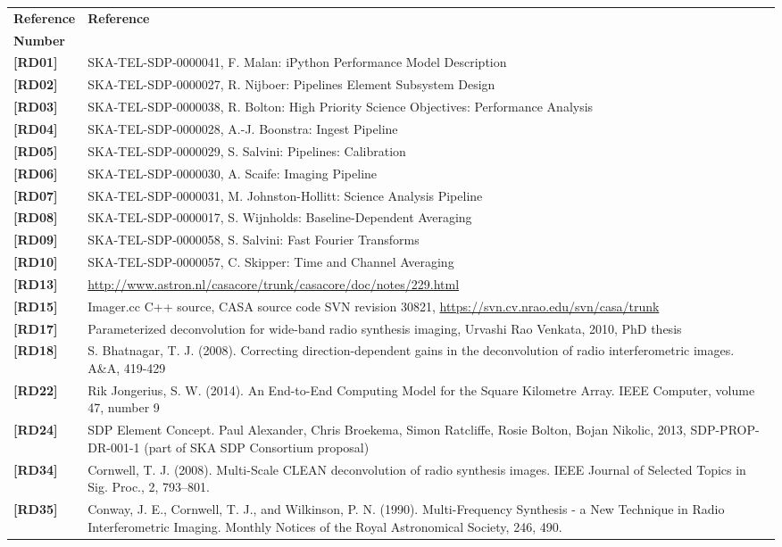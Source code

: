 \documentclass[11pt,a4paper]{article}
\begin{document}
 \begin{center}
 \begin{tabularx}{\textwidth}{|l|X|}
     \hline
     \bf{Reference} & \bf{Reference}\\
     \bf{Number} & \\
     \hline
   {\bf [RD01]} & SKA-TEL-SDP-0000041, F. Malan: iPython Performance Model Description\\
   {\bf [RD02]} & SKA-TEL-SDP-0000027, R. Nijboer: Pipelines Element Subsystem Design\\
   {\bf [RD03]} & SKA-TEL-SDP-0000038, R. Bolton: High Priority Science Objectives: Performance Analysis\\
   {\bf [RD04]} & SKA-TEL-SDP-0000028, A.-J. Boonstra: Ingest Pipeline\\
   {\bf [RD05]} & SKA-TEL-SDP-0000029, S. Salvini: Pipelines: Calibration\\
   {\bf [RD06]} & SKA-TEL-SDP-0000030, A. Scaife: Imaging Pipeline\\
   {\bf [RD07]} & SKA-TEL-SDP-0000031, M. Johnston-Hollitt: Science Analysis Pipeline\\
   {\bf [RD08]} & SKA-TEL-SDP-0000017, S. Wijnholds: Baseline-Dependent Averaging\\
   {\bf [RD09]} & SKA-TEL-SDP-0000058, S. Salvini: Fast Fourier Transforms\\
   {\bf [RD10]} & SKA-TEL-SDP-0000057, C. Skipper: Time and Channel Averaging\\
   {\bf [RD13]} & \url{http://www.astron.nl/casacore/trunk/casacore/doc/notes/229.html}\\
   {\bf [RD15]} & Imager.cc C++ source, CASA source code SVN revision 30821, \url{https://svn.cv.nrao.edu/svn/casa/trunk}\\ 
   {\bf [RD17]} & Parameterized deconvolution for wide-band radio synthesis imaging, Urvashi Rao Venkata, 2010, PhD thesis\\
   {\bf [RD18]} & S. Bhatnagar, T. J. (2008). Correcting direction-dependent gains in the deconvolution of radio interferometric images. A\&A, 419-429\\
   {\bf [RD22]} & Rik Jongerius, S. W. (2014). An End-to-End Computing Model for the Square Kilometre Array. IEEE Computer, volume 47, number 9\\
   {\bf [RD24]} & SDP Element Concept. Paul Alexander, Chris Broekema, Simon Ratcliffe, Rosie Bolton, Bojan Nikolic, 2013, SDP-PROP-DR-001-1 (part of SKA SDP Consortium proposal)\\
   {\bf [RD34]} & Cornwell, T. J. (2008). Multi-Scale CLEAN deconvolution of radio synthesis images. IEEE Journal of Selected Topics in Sig. Proc., 2, 793–801.\\
   {\bf [RD35]} & Conway, J. E., Cornwell, T. J., and Wilkinson, P. N. (1990). Multi-Frequency Synthesis - a New Technique in Radio Interferometric Imaging. Monthly Notices of the Royal Astronomical Society, 246, 490.\\  
   \hline
 \end{tabularx}
\end{center}
\end{document}
